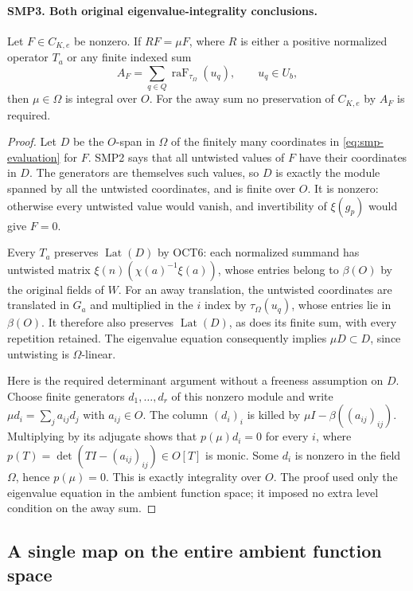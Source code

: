 \documentclass[11pt,a4paper]{article}
\numberwithin{equation}{section}
\theoremstyle{remark}\newtheorem{remark}[theorem]{Remark}
\begin{document}
\paragraph{SMP3. Both original eigenvalue-integrality conclusions.}
\label{claim:SMP3}
Let $F\in C_{K,\allowbreak{} e}$ be nonzero.  If $R F=\mu F$, where
$R$ is either a positive normalized operator $T_a$ or
any finite indexed sum
\[
             A_F=\sum_{q\in Q}\operatorname{raF}_{\tau_\Omega}(u_q),
                    \qquad u_q\in U_b,
\]
then $\mu\in\Omega$ is integral over $O$.
For the away sum no preservation of $C_{K,\allowbreak{} e}$ by
$A_F$ is required.
\begin{proof}
Let $D$ be the $O$-span in $\Omega$ of the finitely
many coordinates in \eqref{eq:smp-evaluation} for $F$.
SMP2 says that all untwisted values of $F$ have their
coordinates in $D$.  The generators are themselves such
values, so $D$ is exactly the module spanned by all the
untwisted coordinates, and is finite over $O$.
It is nonzero: otherwise every untwisted value would
vanish, and invertibility of $\xi(g_p)$ would give $F=0$.

Every $T_a$ preserves $\operatorname{Lat}(D)$ by OCT6:
each normalized summand has untwisted matrix
$\xi(n)(\chi(a)^{-1}\xi(a))$, whose entries belong
to $\beta(O)$ by the original fields of $W$.
For an away translation, the untwisted coordinates are
translated in $G_a$ and multiplied in the $i$ index
by $\tau_\Omega(u_q)$, whose entries lie in $\beta(O)$.
It therefore also preserves $\operatorname{Lat}(D)$,
as does its finite sum, with every repetition retained.
The eigenvalue equation consequently implies
$\mu D\subset D$, since untwisting is $\Omega$-linear.

Here is the required determinant argument without a
freeness assumption on $D$.  Choose finite generators
$d_1,\ldots,\allowbreak{} d_r$ of this nonzero module and write
$\mu d_i=\sum_j a_{ij}d_j$ with $a_{ij}\in O$.
The column $(d_i)_i$ is killed by
$\mu I-\beta((a_{ij})_{ij})$.  Multiplying by its
adjugate shows that
$p(\mu)d_i=0$ for every $i$, where
$p(T)=\det(TI-(a_{ij})_{ij})\in O[T]$ is monic.
Some $d_i$ is nonzero in the field $\Omega$, hence
$p(\mu)=0$.  This is exactly integrality over $O$.
The proof used only the eigenvalue equation in the
ambient function space; it imposed no extra level
condition on the away sum.
\end{proof}

\subsection{A single map on the entire ambient function space}
\end{document}
